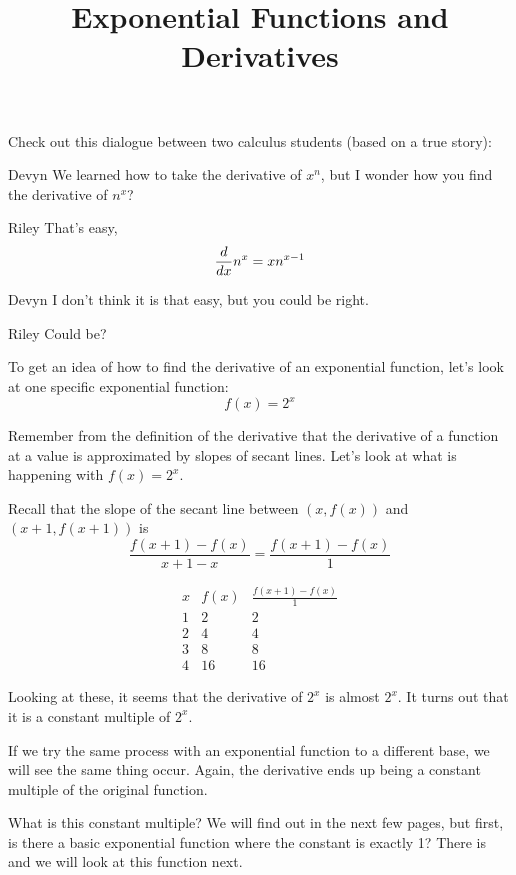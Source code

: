 \documentclass{ximera}
\title[Break-Ground:]{Exponential Functions and Derivatives}
\begin{document}
\begin{abstract}

\end{abstract}
\maketitle

Check out this dialogue between two calculus students (based on a true
story):

\begin{dialogue}
\item[Devyn] We learned how to take the derivative of $x^n$, but I wonder how you find the derivative of $n^x$?
\item[Riley] That's easy, 
\[
\frac{d}{\mathop{}\!d x} n^x = xn^{x-1}
\]
\item[Devyn] I don't think it is that easy, but you could be right.
\item[Riley] Could be?
\end{dialogue}

To get an idea of how to find the derivative of an exponential function, let's look at one specific exponential function:
\[ 
f(x)=2^{x}
\]

Remember from the definition of the derivative that the derivative of a function at a value is approximated by slopes of secant lines. Let's 
look at what is happening with $f(x)=2^{x}$.

Recall that the slope of the secant line between $(x,f(x))$ and $(x+1,f(x+1))$ is 
\[
\frac{f(x+1)-f(x)}{x+1-x} = \frac{f(x+1)-f(x)}{1}
\]

{  \renewcommand*{\arraystretch}{1.3}
  \[
  \begin{array}{c|c|c}
    x & f(x) & \frac{f(x+1)-f(x)}{1}\\ \hline
    1 & 2 & 2\\
    2 & 4  & 4\\
    3 & 8  & 8 \\
    4 & 16 & 16
  \end{array}
  \]
  }



Looking at these, it seems that the derivative of $2^{x}$ is almost $2^{x}$. It turns out that it is a constant multiple of $2^{x}$. 

If we try the same 
process with an exponential function to a different base, we will see the same thing occur. Again, the derivative ends up being a constant 
multiple of the original function. 

What is this constant multiple? We will find out in the next few pages, but first, is there a basic exponential function 
where the constant is exactly 1? There is and we will look at this function next.


 
%
\end{document}
